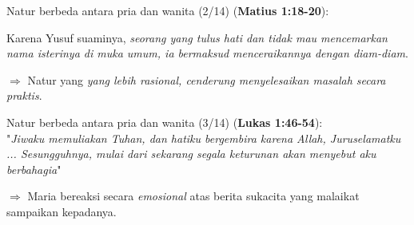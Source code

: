 \documentclass{beamer}
\theoremstyle{mystyle}
\let\emph\relax %
\begin{document}
\begin{frame}{Natur berbeda antara pria dan wanita (2/14)}
\emph{Yusuf} (\textbf{Matius 1:18-20}): 

	 Karena Yusuf suaminya, \textit{seorang yang tulus hati dan tidak mau mencemarkan nama isterinya di muka umum, ia bermaksud menceraikannya dengan diam-diam}.
	
	\bigskip
	 $\Longrightarrow$ Natur yang \textit{yang lebih rasional, cenderung menyelesaikan masalah secara praktis}.

\end{frame}

\begin{frame}{Natur berbeda antara pria dan wanita (3/14)}
\emph{Maria} (\textbf{Lukas 1:46-54}): \\
	\onslide<2-> "\textit{Jiwaku memuliakan Tuhan, dan hatiku bergembira karena Allah, Juruselamatku ... Sesungguhnya, mulai dari sekarang segala keturunan akan menyebut aku berbahagia}"
	
	\bigskip
	 $\Longrightarrow$ Maria bereaksi secara \textit{emosional} atas berita sukacita yang malaikat sampaikan kepadanya.
\end{frame}

%		
%		
%
%
%		
\end{document}
